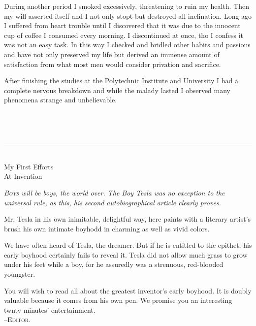 \documentclass[a4paper,12pt,english,twoside,openright]{memoir}
\begin{document}
	During another period I smoked excessively, threatening to ruin my health.  Then my will asserted 
	itself and I not only stopt but destroyed all inclination.  Long ago I suffered from heart trouble until 
	I discovered that it was due to the innocent cup of coffee I consumed every morning.  I 
	discontinued at once, tho I confess it was not an easy task.  In this way I checked and bridled 
	other habits and passions and have not only preserved my life but derived an immense amount of 
	satisfaction from what most men would consider privation and sacrifice.  
	
	After finishing the studies at the Polytechnic Institute and University I had a complete nervous 
	breakdown and while the malady lasted I observed many phenomena strange and unbelievable.

	
	{\centering
		\aldine\\
		\aldine\hspace{1.2em}\aldine
		\par}
	\vspace*{2cm}
	
	
	\cleardoublepage
	\thispagestyle{empty}
	\vspace*{5em}
	\begin{center}
		\bfseries
		\\
		\noindent\rule{.5\linewidth}{1pt}\\
		\medskip
		{\noindent\LARGE My First Efforts \\At Invention}
		
		\bigskip
		
	
	{\normalfont\smallskip\small\protect\parbox{.75\linewidth}{\itshape
			\lettrine[lines=2]{B}{oys} will be boys, the world over. The Boy Tesla was no exception to the universal rule, as this, his second autobiographical article clearly proves.
			
			Mr. Tesla in his own inimitable, delightful way, here paints with a literary artist's brush his own intimate boyhodd in charming as well as vivid colors.
			
			We have often heard of Tesla, the dreamer. But if he is entitled to the epithet, his early boyhood certainly fails to reveal it. Tesla did not allow much grass to grow under his feet while a boy, for he assuredly was a strenuous, red-blooded youngster.
			
			You will wish to read all about the greatest inventor's early boyhood. It is doubly valuable because it comes from his own pen. We promise you an interesting twnty-minutes' entertainment.\\
			
			\hfill --\scshape{Editor}.
		}
		\par
	}

		\vspace*{5em}
	\end{center}
	
\end{document}
